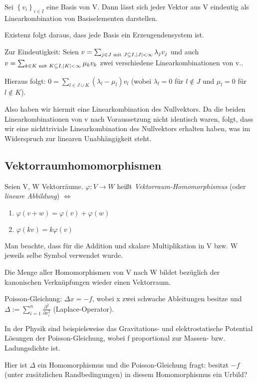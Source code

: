 \documentclass[10pt]{scrbook}
\begin{document}
\begin{Le}
Sei $\left\{v_i\right\}_{i\in I}$ eine Basis von V. Dann lässt sich jeder Vektor aus V eindeutig als Linearkombination von Basiselementen darstellen.
\end{Le}
\begin{bew}
Existenz folgt daraus, dass jede Basis ein Erzeugendensystem ist.

Zur Eindeutigkeit: Seien $v=\sum_{j\in J\textnormal{ mit } J\subseteq I, \left|J\right|<\infty}{\lambda_j v_j}$ und auch $v=\sum_{k\in K\textnormal{ mit } K\subseteq I, \left|K\right|<\infty}{\mu_k v_k}$ zwei verschiedene Linearkombinationen von v..

Hieraus folgt: $0=\sum_{l\in J\cup K}{(\lambda_l-\mu_l) v_l}$ (wobei $\lambda_l=0$ für $l\notin J$ und $\mu_l=0$ für $l\notin K$).

Also haben wir hiermit eine Linearkombination des Nullvektors. Da die beiden Linearkombinationen von v nach Voraussetzung nicht identisch waren, folgt, dass wir eine nichttriviale Linearkombination des Nullvektors erhalten haben, was im Widerspruch zur linearen Unabhängigkeit steht.
\end{bew}

\subsection{Vektorraumhomomorphismen}
\begin{Def}
Seien V, W Vektorräume. $\varphi: V\rightarrow W$ heißt \emph{Vektorraum-Homomorphismus} (oder \emph{lineare Abbildung}) $\Leftrightarrow$
\begin{enumerate}
	\item $\varphi(v+w)=\varphi(v)+\varphi(w)$
	\item $\varphi(k v)=k \varphi(v)$
\end{enumerate}
\end{Def}

Man beachte, dass für die Addition und skalare Multiplikation in V bzw. W jeweils selbe Symbol verwendet wurde.

\begin{Le}
Die Menge aller Homomorphismen von V nach W bildet bezüglich der kanonischen Verknüpfungen wieder einen Vektorraum.
\end{Le}

\begin{Bsp}
Poisson-Gleichung: $\Delta x=-f$, wobei x zwei schwache Ableitungen besitze und $\Delta:=\sum\limits_{i=1}^n{\frac{\partial^2}{\partial x_i^2}}$ (Laplace-Operator).

In der Physik sind beispielsweise das Gravitations- und elektrostatische Potential Lösungen der Poisson-Gleichung, wobei f proportional zur Massen- bzw. Ladungsdichte ist.

Hier ist $\Delta$ ein Homomorphismus und die Poisson-Gleichung fragt: besitzt $-f$ (unter zusätzlichen Randbedingungen) in diesem Homomorphismus ein Urbild?
\end{Bsp}
\end{document}

